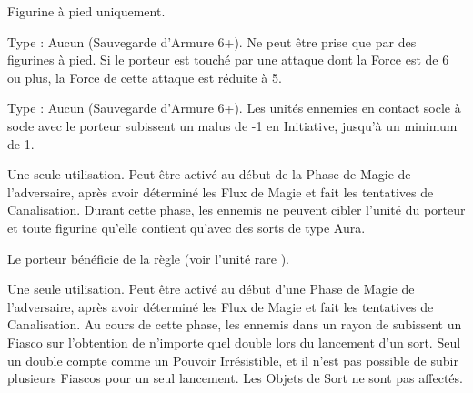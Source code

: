 \endpricelist

\armymagicalarmour

\startpricelist

Figurine à pied uniquement.

Type : Aucun (Sauvegarde d'Armure 6+). Ne peut être prise que par des figurines à pied.\newline
Si le porteur est touché par une attaque dont la Force est de 6 ou plus, la Force de cette attaque est réduite à 5.

Type : Aucun (Sauvegarde d'Armure 6+). Les unités ennemies en contact socle à socle avec le porteur subissent un malus de -1 en Initiative, jusqu'à un minimum de 1.

\endpricelist

\armytalismans

\startpricelist

Une seule utilisation. Peut être activé au début de la Phase de Magie de l'adversaire, après avoir déterminé les Flux de Magie et fait les tentatives de Canalisation. Durant cette phase, les \wizards{} ennemis ne peuvent cibler l'unité du porteur et toute figurine qu'elle contient qu'avec des sorts de type Aura.

\endpricelist

\armyenchanteditems

\startpricelist

Le porteur bénéficie de la règle \stoneskin{} (voir l'unité rare \rockaurochs{}).

\endpricelist

\armyarcaneitems

\startpricelist

Une seule utilisation. Peut être activé au début d'une Phase de Magie de l'adversaire, après avoir déterminé les Flux de Magie et fait les tentatives de Canalisation. Au cours de cette phase, les \wizards{} ennemis dans un rayon de  subissent un Fiasco sur l'obtention de n'importe quel double lors du lancement d'un sort. Seul un double  compte comme un Pouvoir Irrésistible, et il n'est pas possible de subir plusieurs Fiascos pour un seul lancement. Les Objets de Sort ne sont pas affectés.

\endpricelist

\armymagicalbanners


